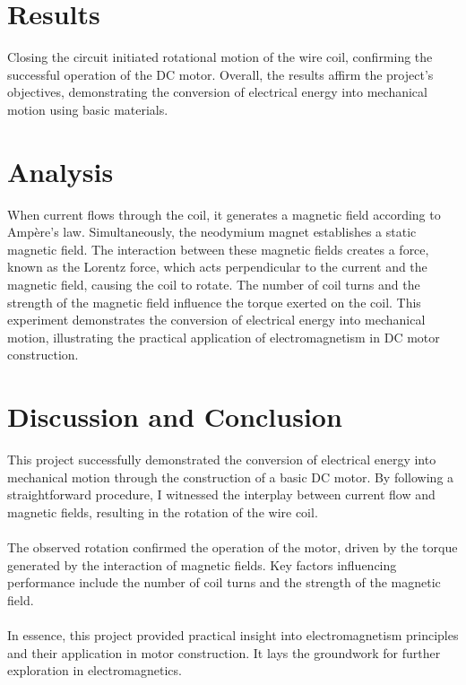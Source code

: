\documentclass[12pt]{article}
\begin{document}
\section{Results}

Closing the circuit initiated rotational motion of the wire coil, confirming the successful
operation of the DC motor. Overall, the results affirm the project's objectives,
demonstrating the conversion of electrical energy into mechanical motion using basic
materials.

\section{Analysis}

When current flows through the coil, it generates a magnetic
field according to Ampère's law. Simultaneously, the neodymium magnet establishes
a static magnetic field. The interaction between these magnetic fields creates a force,
known as the Lorentz force, which acts perpendicular to the current and the magnetic
field, causing the coil to rotate. The number of coil turns and the strength of the
magnetic field influence the torque exerted on the coil. This experiment demonstrates
the conversion of electrical energy into mechanical motion, illustrating the practical
application of electromagnetism in DC motor construction.

\section{Discussion and Conclusion}

This project successfully demonstrated the conversion of electrical energy into mechanical
motion through the construction of a basic DC motor. By following a straightforward
procedure, I witnessed the interplay between current flow and magnetic fields,
resulting in the rotation of the wire coil. \\ \\
The observed rotation confirmed the operation of the motor, driven by the torque
generated by the interaction of magnetic fields. Key factors influencing performance
include the number of coil turns and the strength of the magnetic field. \\ \\
In essence, this project provided practical insight into electromagnetism principles
and their application in motor construction. It lays the groundwork for further
exploration in electromagnetics.
\end{document}
